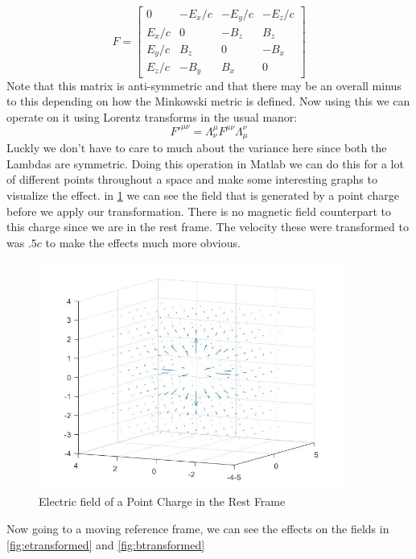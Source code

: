 \documentclass{article}
\begin{document}
\begin{equation}
	F = \begin{bmatrix}
		0 & -E_x/c & -E_y/c & -E_z/c \\
		E_x/c & 0 & -B_z & B_z \\
		E_y/c & B_z & 0 & -B_x \\
		E_z/c & -B_y & B_x & 0
	\end{bmatrix}
\end{equation}
Note that this matrix is anti-symmetric and that there may be an overall minus to this depending on how the Minkowski metric is defined.
Now using this we can operate on it using Lorentz transforms in the usual manor:
\begin{equation}
	F'^{\mu \nu}= \Lambda^\mu_\nu F^{\mu \nu} \Lambda^\nu_\mu
\end{equation}
Luckly we don't have to care to much about the variance here since both the Lambdas are symmetric. Doing this operation in Matlab we can do this for a lot of different points throughout a space and make some interesting graphs to visualize the effect.
in \ref{fig:untransformed} we can see the field that is generated by a point charge before we apply our transformation. There is no magnetic field counterpart to this charge since we are in the rest frame. The velocity these were transformed to was $.5c$ to make the effects much more obvious.

\begin{figure}[h!]
  \includegraphics[width=100mm,scale=.5]{untransformed.jpg}
  \caption{Electric field of a Point Charge in the Rest Frame}
  \label{fig:untransformed}
\end{figure}

Now going to a moving reference frame, we can see the effects on the fields in \ref{fig:etransformed} and \ref{fig:btransformed}
\end{document}
